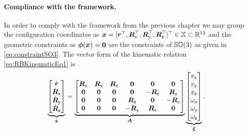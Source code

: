 \paragraph*{Compliance with the framework.}
In order to comply with the framework from the previous chapter we may group the configuration coordinates as $\sysCoord = [\r^\top, \Rx^\top, \Ry^\top, \Rz^\top]^\top \in \configSpace \subset\RealNum^{12}$ and the geometric constraints as $\geoConstraint(\sysCoord) = \tuple{0}$ are the constraints of $\SpecialOrthogonalGroup(3)$ as given in \eqref{eq:constraintSO3}.
The vector form of the kinematic relation \eqref{eq:RBKinematicEq1} is 
\begin{align}\label{eq:RBKinematicEq2} 
 \underbrace{\begin{bmatrix} \rd \\ \Rxd \\ \Ryd \\ \Rzd  \end{bmatrix}}_{\sysCoordd}
 = 
 \underbrace{\begin{bmatrix}
  \Rx & \Ry & \Rz & \tuple{0} & \tuple{0} & \tuple{0} \\
  \tuple{0} & \tuple{0} & \tuple{0} & \tuple{0} & -\Rz & \Ry \\
  \tuple{0} & \tuple{0} & \tuple{0} & \Rz & \tuple{0} & -\Rx \\
  \tuple{0} & \tuple{0} & \tuple{0} & -\Ry & \Rx & \tuple{0}
 \end{bmatrix}}_{\kinMat}
 \underbrace{\begin{bmatrix} \vx \\ \vy \\ \vz \\ \wx \\ \wy \\ \wz \end{bmatrix}}_{\sysVel}
 .
\end{align}

